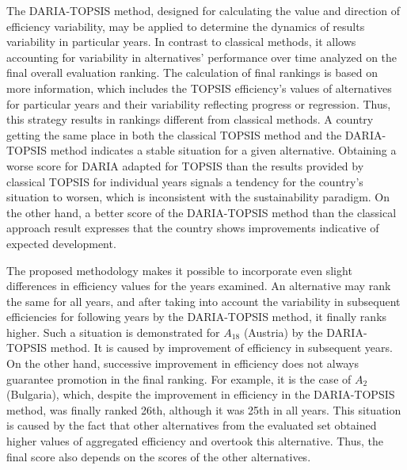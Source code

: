 \documentclass[5p,times]{elsarticle}
\newcounter{example}[section]
\begin{document}
The DARIA-TOPSIS method, designed for calculating the value and direction of efficiency variability, may be applied to determine the dynamics of results variability in particular years. In contrast to classical methods, it allows accounting for variability in alternatives' performance over time analyzed on the final overall evaluation ranking. The calculation of final rankings is based on more information, which includes the TOPSIS efficiency's values of alternatives for particular years and their variability reflecting progress or regression. Thus, this strategy results in rankings different from classical methods.
A country getting the same place in both the classical TOPSIS method and the DARIA-TOPSIS method indicates a stable situation for a given alternative. Obtaining a worse score for DARIA adapted for TOPSIS than the results provided by classical TOPSIS for individual years signals a tendency for the country's situation to worsen, which is inconsistent with the sustainability paradigm. On the other hand, a better score of the DARIA-TOPSIS method than the classical approach result expresses that the country shows improvements indicative of expected development.

The proposed methodology makes it possible to incorporate even slight differences in efficiency values for the years examined. An alternative may rank the same for all years, and after taking into account the variability in subsequent efficiencies for following years by the DARIA-TOPSIS method, it finally ranks higher. Such a situation is demonstrated for $A_{18}$ (Austria) by the DARIA-TOPSIS method. It is caused by improvement of efficiency in subsequent years. On the other hand, successive improvement in efficiency does not always guarantee promotion in the final ranking. For example, it is the case of $A_{2}$ (Bulgaria), which, despite the improvement in efficiency in the DARIA-TOPSIS method, was finally ranked 26th, although it was 25th in all years. This situation is caused by the fact that other alternatives from the evaluated set obtained higher values of aggregated efficiency and overtook this alternative. Thus, the final score also depends on the scores of the other alternatives.
\end{document}
